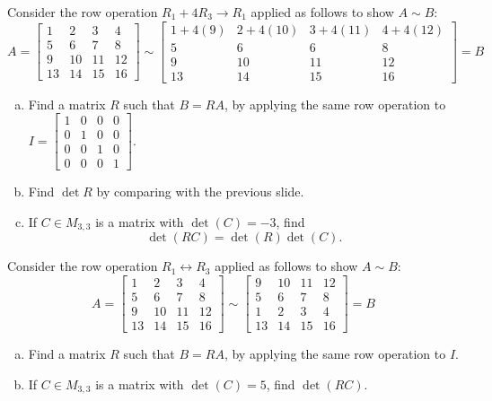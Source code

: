 \begin{activity}{5}
Consider the row operation \(R_1+4R_3\to R_1\) applied as follows to show
\(A\sim B\):
\[
A=\begin{bmatrix}1&2&3 & 4\\5&6 & 7 & 8\\9 & 10 & 11 & 12 \\ 13 & 14 & 15 & 16\end{bmatrix} 
  \sim
\begin{bmatrix}1+4(9)&2+4(10)&3+4(11) & 4+4(12) \\5&6 & 6 & 8\\9 & 10 & 11 & 12 \\ 13 & 14 & 15 & 16\end{bmatrix}=B
\]
\begin{enumerate}[(a)]
\item Find a matrix \(R\) such that \(B=RA\), by applying the same row operation to 
\(I=\begin{bmatrix}1&0&0&0\\0&1&0&0\\0&0&1&0\\0&0&0&1\end{bmatrix}\).
\item Find \(\det R\) by comparing with the previous slide.
\item If \(C \in M_{3,3}\) is a matrix with \(\det(C)= -3\), find 
\[\det(RC)=\det(R)\det(C).\]
\end{enumerate}
\end{activity}

\begin{activity}{5}
Consider the row operation \(R_1\leftrightarrow R_3\) applied as follows to show
\(A\sim B\):
\[
A=\begin{bmatrix}1&2&3&4\\5&6&7&8\\9&10&11&12 \\ 13 & 14 & 15 & 16\end{bmatrix}
  \sim
\begin{bmatrix}9&10&11&12\\5&6&7&8\\1&2&3&4 \\ 13 & 14 & 15 & 16\end{bmatrix}=B
\]
\begin{enumerate}[(a)]
\item Find a matrix \(R\) such that \(B=RA\), by applying the same row operation to \(I\).
\item If \(C \in M_{3,3}\) is a matrix with \(\det(C)= 5\), find \(\det(RC)\).
\end{enumerate}
\end{activity}

